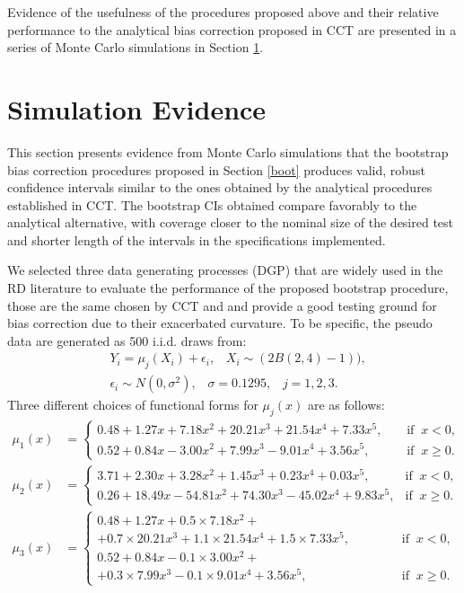 \documentclass[12pt,fleqn]{article}
\begin{document}
Evidence of the usefulness of the procedures proposed above and their relative performance to the analytical bias correction proposed in CCT are presented in a series of Monte Carlo simulations in Section \ref{sim}.

\section{Simulation Evidence}\label{sim}

This section presents evidence from Monte Carlo simulations that the bootstrap bias correction procedures proposed in Section \ref{boot} produces valid, robust confidence intervals similar to the ones obtained by the analytical procedures established in CCT. The bootstrap CIs obtained compare favorably to the analytical alternative, with coverage closer to the nominal size of the desired test and shorter length of the intervals in the specifications implemented.

We selected three data generating processes (DGP) that are widely used in the RD literature to evaluate the performance of the proposed bootstrap procedure, those are the same chosen by CCT and \cite{IK} and provide a good testing ground for bias correction due to their exacerbated curvature. To be specific, the pseudo data are generated as 500 i.i.d. draws from:
\begin{align*}
& Y_{i} = \mu_{j}(X_{i}) + \epsilon_{i}, \;\;\; X_{i} \sim  (2 B (2,4) - 1)), \\
& \epsilon_{i} \sim N(0, \sigma^{2}), \;\;\; \sigma = 0.1295, \;\;\; j = 1,2,3.
\end{align*}
Three different choices of functional forms for $\mu_{j}(x)$ are as follows:
\begin{align}
\mu_{1}(x) & = 
\begin{cases}
0.48 + 1.27x + 7.18x^{2} + 20.21x^{3} + 21.54x^{4} + 7.33x^{5}, \;\;\;\; & \text{if} \;\; x < 0, \\
0.52 + 0.84x - 3.00x^{2} + 7.99x^3 - 9.01x^4 + 3.56x^{5},  & \text{if} \;\; x \ge 0.
\end{cases}
\\
\mu_{2}(x) & = 
\begin{cases}
3.71 + 2.30x + 3.28x^2 + 1.45x^3 + 0.23x^4 + 0.03x^5, \;\; & \text{if} \;\; x < 0, \\
0.26 + 18.49x - 54.81x^2 + 74.30x^3 - 45.02x^4 + 9.83x^5,  & \text{if} \;\; x \ge 0.
\end{cases}
\\
\mu_{3}(x) & =
\begin{cases}
0.48 + 1.27x + 0.5 \times 7.18x^{2}+ \\
+ 0.7 \times 20.21x^3 + 1.1 \times 21.54x^4 + 1.5 \times 7.33x^5, \;\;\;\;\;\;\;\;\;\;\;\; & \text{if} \;\; x < 0, \\
0.52 + 0.84x - 0.1 \times 3.00x^{2}+ \\
+ 0.3 \times 7.99x^3 - 0.1 \times 9.01x^4 + 3.56x^5, & \text{if} \;\; x \ge 0.
\end{cases}
\end{align}
\end{document}
